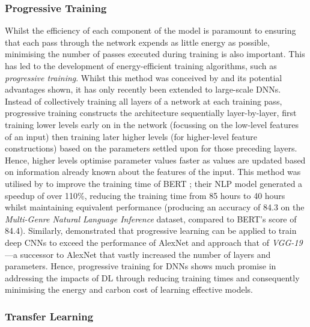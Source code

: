 \documentclass[a4paper, 12pt]{article}
\begin{document}
    \subsubsection{Progressive Training}

    Whilst the efficiency of each component of the model is paramount to ensuring that each pass through the network expends as little energy as possible, minimising the number of passes executed during training is also important. This has led to the development of energy-efficient training algorithms, such as \emph{progressive training}. Whilst this method was conceived by  and its potential advantages shown, it has only recently been extended to large-scale DNNs. Instead of collectively training all layers of a network at each training pass, progressive training constructs the architecture sequentially layer-by-layer, first training lower levels early on in the network (focussing on the low-level features of an input) then training later higher levels (for higher-level feature constructions) based on the parameters settled upon for those preceding layers. Hence, higher levels optimise parameter values faster as values are updated based on information already known about the features of the input. This method was utilised by  to improve the training time of BERT \cite{devlin-2019}; their NLP model generated a speedup of over 110\%, reducing the training time from 85 hours to 40 hours whilst maintaining equivalent performance (producing an accuracy of 84.3 on the \emph{Multi-Genre Natural Language Inference} dataset, compared to BERT's score of 84.4). Similarly,  demonstrated that progressive learning can be applied to train deep CNNs to exceed the performance of AlexNet and approach that of \emph{VGG-19} \cite{simonyan-2014}---a successor to AlexNet that vastly increased the number of layers and parameters. Hence, progressive training for DNNs shows much promise in addressing the impacts of DL through reducing training times and consequently minimising the energy and carbon cost of learning effective models.

    \subsubsection{Transfer Learning}
\end{document}
